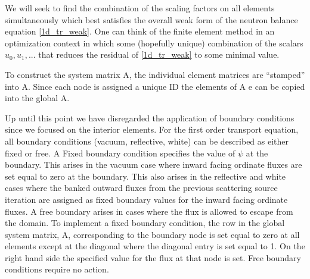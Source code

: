 We will seek to find the combination of the scaling factors on all elements simultaneously which best satisfies the overall weak form of the neutron balance equation \ref{1d_tr_weak}.  One can think of the finite element method in an optimization context in which some (hopefully unique) combination of the scalars ${u_0, u_1, ...}$ that reduces the residual of \ref{1d_tr_weak} to some minimal value.
 
 To construct the system matrix A, the individual element matrices are ``stamped'' into A. Since
each node is assigned a unique ID the elements of A e can be copied into the global A.
 
Up until this point we have disregarded the application of boundary conditions since we focused on the interior elements.  For the first order transport equation, all boundary conditions (vacuum, reflective, white) can be
described as either fixed or free. A Fixed boundary condition specifies the value of $\psi$ at the boundary.
This arises in the vacuum case where inward facing ordinate fluxes are set equal to zero at the
boundary. This also arises in the reflective and white cases where the banked outward fluxes from the
previous scattering source iteration are assigned as fixed boundary values for the inward facing ordinate
fluxes. A free boundary arises in cases where the flux is allowed to escape from the domain.
To implement a fixed boundary condition, the row in the global system matrix, A, corresponding
to the boundary node is set equal to zero at all elements except at the diagonal where the diagonal
entry is set equal to 1. On the right hand side the specified value for the flux at that node is set.
Free boundary conditions require no action.